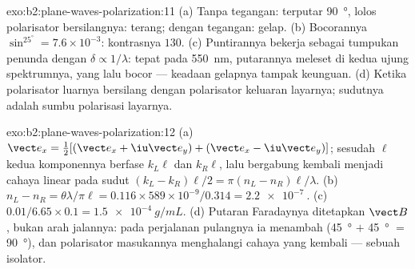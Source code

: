 \begin{solution}{exo:b2:plane-waves-polarization:11}
(a) Tanpa tegangan: terputar \qty{90}{\degree}, lolos polarisator bersilangnya:
terang; dengan tegangan: gelap. (b) Bocorannya $\sin^25^\circ = 7.6 \times 10^{-3}$: kontrasnya
$130$. (c) Puntirannya bekerja sebagai tumpukan penunda dengan $\delta \propto 1/\lambda$:
tepat pada \qty{550}{nm}, putarannya meleset di kedua ujung spektrumnya,
yang lalu bocor --- keadaan gelapnya tampak keunguan. (d) Ketika polarisator
luarnya bersilang dengan polarisator keluaran layarnya; sudutnya adalah
sumbu polarisasi layarnya.
\end{solution}

\begin{solution}{exo:b2:plane-waves-polarization:12}
(a) $\vect e_x = \tfrac12[(\vect e_x + \iu\vect e_y) + (\vect e_x - \iu\vect e_y)]$; sesudah $\ell$
kedua komponennya berfase $k_L\ell$ dan $k_R\ell$, lalu bergabung kembali menjadi
cahaya linear pada sudut $(k_L - k_R)\ell/2 = \pi(n_L - n_R)\ell/\lambda$. (b) $n_L -
n_R = \theta\lambda/\pi\ell = 0.116 \times 589 \times 10^{-9}/0.314 = \qty{2.2e-7}{}$. (c)
$0.01/6.65 \times 0.1 = \qty{1.5e-4}{g/mL}$. (d) Putaran Faradaynya ditetapkan
$\vect B$, bukan arah jalannya: pada perjalanan pulangnya ia menambah
(\qty{45}{\degree} $+$ \qty{45}{\degree} $=$ \qty{90}{\degree}), dan polarisator masukannya menghalangi
cahaya yang kembali --- sebuah isolator.
\end{solution}

